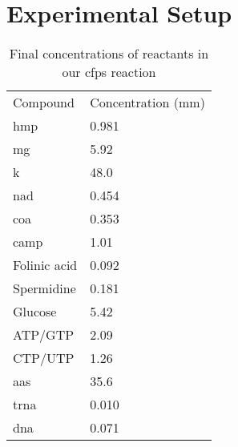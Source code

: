 \chapter{Experimental Setup}\label{app:exp}

\begin{table}[]
\centering
\caption{Final concentrations of reactants in our \gls{cfps} reaction}
\label{tab:cf-conc}
\begin{tabular}{ll}
Compound     & Concentration (\gls{mm}) \\
\gls{hmp}           & 0.981              \\
\gls{mg}           & 5.92               \\
\gls{k}           & 48.0               \\
\gls{nad}          & 0.454              \\
\gls{coa}          & 0.353              \\
\gls{camp}         & 1.01               \\
Folinic acid & 0.092              \\
Spermidine   & 0.181              \\
Glucose      & 5.42               \\
ATP/GTP      & 2.09               \\
CTP/UTP      & 1.26               \\
\glspl{aa}  & 35.6               \\
\gls{trna}        & 0.010              \\
\gls{dna}          & 0.071             
\end{tabular}
\end{table}